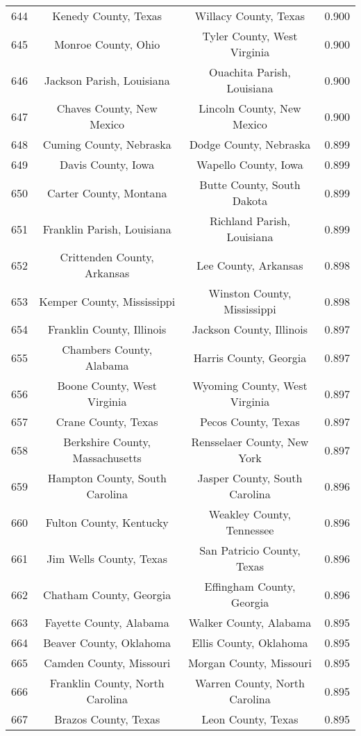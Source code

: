 \begin{longtable}{cccc}
  644 & Kenedy County, Texas & Willacy County, Texas & 0.900 \\ 
  645 & Monroe County, Ohio & Tyler County, West Virginia & 0.900 \\ 
  646 & Jackson Parish, Louisiana & Ouachita Parish, Louisiana & 0.900 \\ 
  647 & Chaves County, New Mexico & Lincoln County, New Mexico & 0.900 \\ 
  648 & Cuming County, Nebraska & Dodge County, Nebraska & 0.899 \\ 
  649 & Davis County, Iowa & Wapello County, Iowa & 0.899 \\ 
  650 & Carter County, Montana & Butte County, South Dakota & 0.899 \\ 
  651 & Franklin Parish, Louisiana & Richland Parish, Louisiana & 0.899 \\ 
  652 & Crittenden County, Arkansas & Lee County, Arkansas & 0.898 \\ 
  653 & Kemper County, Mississippi & Winston County, Mississippi & 0.898 \\ 
  654 & Franklin County, Illinois & Jackson County, Illinois & 0.897 \\ 
  655 & Chambers County, Alabama & Harris County, Georgia & 0.897 \\ 
  656 & Boone County, West Virginia & Wyoming County, West Virginia & 0.897 \\ 
  657 & Crane County, Texas & Pecos County, Texas & 0.897 \\ 
  658 & Berkshire County, Massachusetts & Rensselaer County, New York & 0.897 \\ 
  659 & Hampton County, South Carolina & Jasper County, South Carolina & 0.896 \\ 
  660 & Fulton County, Kentucky & Weakley County, Tennessee & 0.896 \\ 
  661 & Jim Wells County, Texas & San Patricio County, Texas & 0.896 \\ 
  662 & Chatham County, Georgia & Effingham County, Georgia & 0.896 \\ 
  663 & Fayette County, Alabama & Walker County, Alabama & 0.895 \\ 
  664 & Beaver County, Oklahoma & Ellis County, Oklahoma & 0.895 \\ 
  665 & Camden County, Missouri & Morgan County, Missouri & 0.895 \\ 
  666 & Franklin County, North Carolina & Warren County, North Carolina & 0.895 \\ 
  667 & Brazos County, Texas & Leon County, Texas & 0.895 \\ 

\end{longtable}
